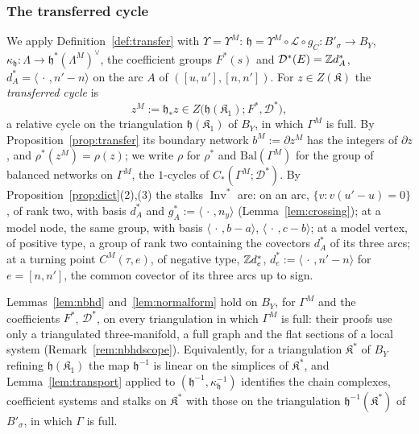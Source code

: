 \subsubsection*{The transferred cycle}
We apply Definition~\ref{def:transfer} with $\Upsilon=\Upsilon^M$: $\mathfrak h=\Upsilon^M\circ\mathcal L\circ g_C\colon B'_\sigma\to
B_Y$, $\kappa_{\mathfrak h}\colon\Lambda\to\mathfrak h^*(\Lambda^M)^\vee$, the coefficient groups $F^*(s)$ and $\mathcal D^*(E)=\mathbb Z d^*_A$,
$d^*_A=\langle\,\cdot\,,n'-n\rangle$ on the arc $A$ of $([u,u'],[n,n'])$. For $z\in Z(\mathfrak K)$ the \emph{transferred
cycle} is
\[
z^M:=\mathfrak h_*z\in Z\bigl(\mathfrak h(\mathfrak K_1);F^*,\mathcal D^*\bigr),
\]
a relative cycle on the triangulation $\mathfrak h(\mathfrak K_1)$ of $B_Y$, in which $\Gamma^M$ is full. By
Proposition~\ref{prop:transfer} its boundary network $b^M:=\partial z^M$ has the integers of $\partial z$, and
$\rho^*(z^M)=\rho(z)$; we write $\rho$ for $\rho^*$ and $\mathrm{Bal}(\Gamma^M)$ for the group of balanced networks on
$\Gamma^M$, the $1$-cycles of $C_*(\Gamma^M;\mathcal D^*)$. By Proposition~\ref{prop:dict}(2),(3) the stalks
$\operatorname{Inv}^*$ are: on an arc, $\{v:v(u'-u)=0\}$, of rank two, with basis $d^*_A$ and $g^*_A:=\langle\,\cdot\,,n_y
\rangle$ (Lemma~\ref{lem:crossing}); at a model node, the same group, with basis $\langle\,\cdot\,,b-a\rangle$,
$\langle\,\cdot\,,c-b\rangle$; at a model vertex, of positive type, a group of rank two containing the covectors $d^*_A$ of
its three arcs; at a turning point $C^M(\tau,e)$, of negative type, $\mathbb Z d^*_e$, $d^*_e:=\langle\,\cdot\,,n'-n\rangle$ for
$e=[n,n']$, the common covector of its three arcs up to sign.

Lemmas~\ref{lem:nbhd} and~\ref{lem:normalform} hold on $B_Y$, for $\Gamma^M$ and the coefficients $F^*$, $\mathcal D^*$,
on every triangulation in which $\Gamma^M$ is full: their proofs use only a triangulated three-manifold, a full graph and
the flat sections of a local system (Remark~\ref{rem:nbhdscope}). Equivalently, for a triangulation $\mathfrak K^*$ of $B_Y$
refining $\mathfrak h(\mathfrak K_1)$ the map $\mathfrak h^{-1}$ is linear on the simplices of $\mathfrak K^*$, and Lemma~\ref{lem:transport}
applied to $(\mathfrak h^{-1},\kappa_{\mathfrak h}^{-1})$ identifies the chain complexes, coefficient systems and stalks on $\mathfrak K^*$ with those
on the triangulation $\mathfrak h^{-1}(\mathfrak K^*)$ of $B'_\sigma$, in which $\Gamma$ is full.

